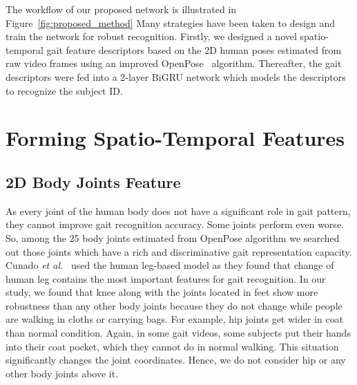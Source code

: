 The workflow of our proposed network is illustrated in Figure~\ref{fig:proposed_method} Many strategies have been taken to design and train the network for robust recognition. Firstly, we designed a novel spatio-temporal gait feature descriptors based on the 2D human poses estimated from raw video frames using an improved OpenPose~\cite{Cao_19} algorithm. Thereafter, the gait descriptors were fed into a 2-layer BiGRU network which models the descriptors to recognize the subject ID.


\section{Forming Spatio-Temporal Features}

\subsection{2D Body Joints Feature}
As every joint of the human body does not have a significant role in gait pattern, they cannot improve gait recognition accuracy. Some joints perform even worse. So, among the 25 body joints estimated from OpenPose algorithm we searched out those joints which have a rich and discriminative gait representation capacity. Cunado \textit{et al.}~\cite{Cunado_97} used the human leg-based model as they found that change of human leg contains the most important features for gait recognition.  In our study, we found that knee along with the joints located in feet show more robustness than any other body joints because they do not change while people are walking in cloths or carrying bags. For example, hip joints get wider in coat than normal condition. Again, in some gait videos, some subjects put their hands into their coat pocket, which they cannot do in normal walking. This situation significantly changes the joint coordinates. Hence, we do not consider hip or any other body joints above it.

